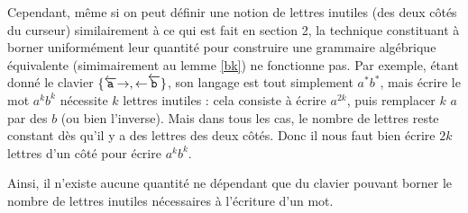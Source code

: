 \documentclass[12pt, a4paper]{article}
\begin{document}
    Cependant, même si on peut définir une notion de lettres inutiles (des deux côtés du curseur) similairement à ce qui est fait en section 2, la technique constituant à borner uniformément leur quantité pour construire une grammaire algébrique équivalente (simimairement au lemme \ref{bk}) ne fonctionne pas.
    Par exemple, étant donné le clavier $\{\overleftarrow{\mathtt{a}}\mathord{\rightarrow},\mathord{\leftarrow}\overleftarrow{\mathtt{b}}\}$, son langage est tout simplement $a^*b^*$, mais écrire le mot $a^kb^k$ nécessite $k$ lettres inutiles : cela consiste à écrire $a^{2k}$, puis remplacer $k$ $a$ par des $b$ (ou bien l'inverse). Mais dans tous les cas, le nombre de lettres reste constant dès qu'il y a des lettres des deux côtés. Donc il nous faut bien écrire $2k$ lettres d'un côté pour écrire $a^kb^k$.
    
    Ainsi, il n'existe aucune quantité ne dépendant que du clavier pouvant borner le nombre de lettres inutiles nécessaires à l'écriture d'un mot.
    
    \clearpage
    \appendix
\end{document}
